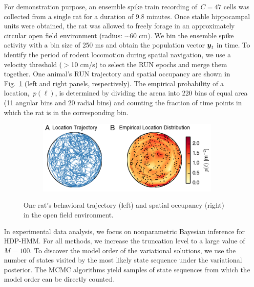 For demonstration purpose, an ensemble spike train recording
of~${C=47}$ cells was collected from a single rat for a duration of
9.8 minutes.  Once stable hippocampal units were obtained, the rat was
allowed to freely forage in an approximately circular open field
environment (radius: $\sim$60 cm).  We bin the ensemble spike activity
with a bin size of 250 ms and obtain the population vector $\boldsymbol{y}_t$ in
time.  To identify the period of rodent locomotion during spatial
navigation, we use a velocity threshold ($>$10 cm/s) to select the RUN
epochs and merge them together.  One animal's RUN trajectory and
spatial occupancy are shown in Fig.~\ref{fig4} (left and right panels,
respectively). The empirical probability of a location,~${p(\ell)}$,
is determined by dividing the arena into 220 bins of equal area (11
angular bins and 20 radial bins) and counting the fraction of time
points in which the rat is in the corresponding bin.

\begin{figure}
\centering
\begin{subfigure}[t]{\textwidth}
\centering
\includegraphics[width=4in]{figures/ch5/Fig4}
\end{subfigure}
\caption[Trajectory of the freely foraging rat during hippocampal
  recording]{One rat's behavioral trajectory (left) and spatial
  occupancy (right) in the open field environment. }
\label{fig4}
\end{figure}

In experimental data analysis, we focus on nonparametric Bayesian
inference for HDP-HMM.  For all methods, we increase the truncation
level to a large value of $M=100$.  To discover the model order of the
variational solutions, we use the number of states visited by the most
likely state sequence under the variational posterior. The MCMC
algorithms yield samples of state sequences from which the model order
can be directly counted.


